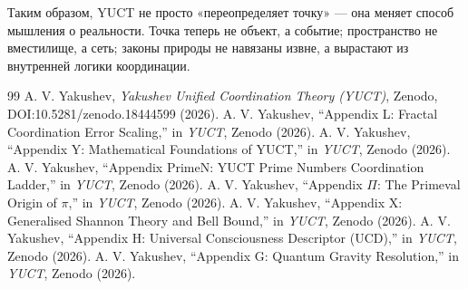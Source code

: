 \documentclass[12pt,a4paper]{article}
\begin{document}
	\medskip
	Таким образом, YUCT не просто «переопределяет точку» — она меняет способ мышления о реальности. Точка теперь не объект, а событие; пространство не вместилище, а сеть; законы природы не навязаны извне, а вырастают из внутренней логики координации.
	
	\begin{thebibliography}{99}
		 A. V. Yakushev, \emph{Yakushev Unified Coordination Theory (YUCT)}, Zenodo, DOI:10.5281/zenodo.18444599 (2026).
		 A. V. Yakushev, ``Appendix L: Fractal Coordination Error Scaling,'' in \emph{YUCT}, Zenodo (2026).
		 A. V. Yakushev, ``Appendix Y: Mathematical Foundations of YUCT,'' in \emph{YUCT}, Zenodo (2026).
		 A. V. Yakushev, ``Appendix PrimeN: YUCT Prime Numbers Coordination Ladder,'' in \emph{YUCT}, Zenodo (2026).
		 A. V. Yakushev, ``Appendix \(\Pi\): The Primeval Origin of \(\pi\),'' in \emph{YUCT}, Zenodo (2026).
		 A. V. Yakushev, ``Appendix X: Generalised Shannon Theory and Bell Bound,'' in \emph{YUCT}, Zenodo (2026).
		 A. V. Yakushev, ``Appendix H: Universal Consciousness Descriptor (UCD),'' in \emph{YUCT}, Zenodo (2026).
		 A. V. Yakushev, ``Appendix G: Quantum Gravity Resolution,'' in \emph{YUCT}, Zenodo (2026).
	\end{thebibliography}
	
\end{document}
